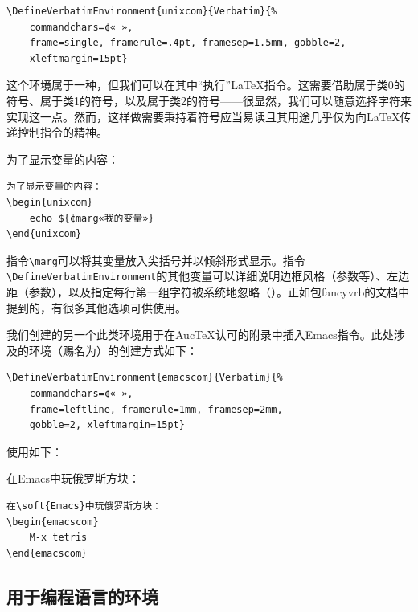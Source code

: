 \begin{dmd}
\begin{verbatim}
\DefineVerbatimEnvironment{unixcom}{Verbatim}{% 
    commandchars=¢« »,
    frame=single, framerule=.4pt, framesep=1.5mm, gobble=2,
    xleftmargin=15pt}
\end{verbatim}
\end{dmd}

这个环境属于一种，但我们可以在其中“执行”\LaTeX 指令。这需要借助属于类0的符号、属于类1的符号，以及属于类2的符号——很显然，我们可以随意选择字符来实现这一点。然而，这样做需要秉持着符号应当易读且其用途几乎仅为向\LaTeX 传递控制指令的精神。

\begin{codelist}[10.5]{%
为了显示变量的内容：\\
\dm{\}}
}\begin{verbatim}
为了显示变量的内容：
\begin{unixcom}
    echo ${¢marg«我的变量»} 
\end{unixcom}
\end{verbatim}
\end{codelist}


指令\verb|\marg|可以将其变量放入尖括号并以倾斜形式显示。指令\verb|\DefineVerbatimEnvironment|的其他变量可以详细说明边框风格（参数等）、左边距（参数），以及指定每行第一组字符被系统地忽略（）。正如包\textsf{fancyvrb}的文档中提到的，有很多其他选项可供使用。

我们创建的另一个此类环境用于在Auc\TeX 认可的附录中插入\textsf{Emacs}指令。此处涉及的环境（赐名为）的创建方式如下：

\begin{dmd}
\begin{verbatim}
\DefineVerbatimEnvironment{emacscom}{Verbatim}{%
    commandchars=¢« »,
    frame=leftline, framerule=1mm, framesep=2mm, 
    gobble=2, xleftmargin=15pt}
\end{verbatim}
\end{dmd}

使用如下：

\begin{codelist}[10.6]{
在\textsf{Emacs}中玩俄罗斯方块：\\
}\begin{verbatim}
在\soft{Emacs}中玩俄罗斯方块：
\begin{emacscom}
    M-x tetris
\end{emacscom}
\end{verbatim}
\end{codelist}

\subsection{用于编程语言的环境}
